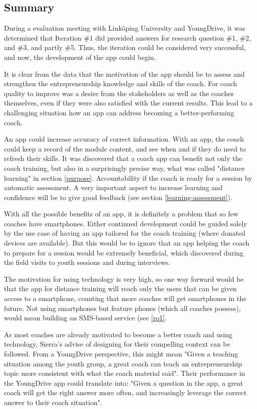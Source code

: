 \subsection{Summary}

During a evaluation meeting with Linköping University and YoungDrive, it was determined that Iteration \#1 did provided answers for research question \#1, \#2, and \#3, and partly \#5. Thus, the iteration could be considered very successful, and now, the development of the app could begin.

It is clear from the data that the motivation of the app should be to assess and strengthen the entrepreneurship knowledge and skills of the coach. For coach quality to improve was a desire from the stakeholders as well as the coaches themselves, even if they were also satisfied with the current results. This lead to a challenging situation how an app can address becoming a better-performing coach.

An app could increase accuracy of correct information. With an app, the coach could keep a record of the module content, and see when and if they do need to refresh their skills. It was discovered that a coach app can benefit not only the coach training, but also in a surprisingly precise way, what was called "distance learning" in section \ref{purpose}. Accountability if the coach is ready for a session by automatic assessment. A very important aspect to increase learning and confidence will be to give good feedback (see section \ref{learning-assessment}).

With all the possible benefits of an app, it is definitely a problem that so few coaches have smartphones. Either continued development could be guided solely by the use case of having an app tailored for the coach training (where donated devices are available). But this would be to ignore that an app helping the coach to prepare for a session would be extremely beneficial, which discovered during the field visits to youth sessions and during interviews.

The motivation for using technology is very high, so one way forward would be that the app for distance training will reach only the users that can be given access to a smartphone, counting that more coaches will get smartphones in the future. Not using smartphones but feature phones (which all coaches possess), would mean building an SMS-based service (see \ref{rq1}.

As most coaches are already motivated to become a better coach and using technology, Sierra's \citep{sierra} advise of designing for their compelling context can be followed. From a YoungDrive perspective, this might mean "Given a teaching situation among the youth group, a great coach can teach an entrepreneurship topic more consistent with what the coach material said". Their performance in the YoungDrive app could translate into: "Given a question in the app, a great coach will get the right answer more often, and increasingly leverage the correct answer to their coach situation".

